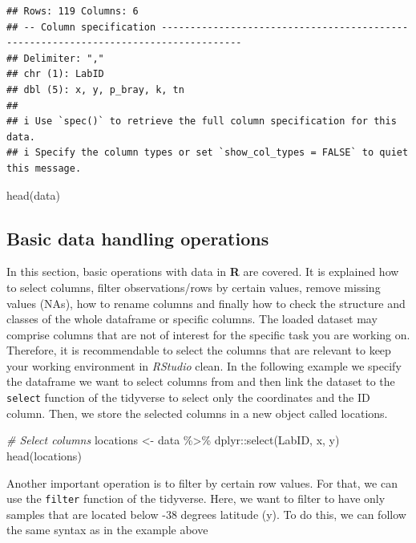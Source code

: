 \documentclass[
  10pt,
  b5paper,
  oneside]{book}
\newenvironment{Shaded}{\begin{snugshade}}{\end{snugshade}}
\newcommand{\CommentTok}[1]{\textcolor[rgb]{0.56,0.35,0.01}{\textit{#1}}}
\newcommand{\FunctionTok}[1]{\textcolor[rgb]{0.00,0.00,0.00}{#1}}
\newcommand{\NormalTok}[1]{#1}
\newcommand{\OtherTok}[1]{\textcolor[rgb]{0.56,0.35,0.01}{#1}}
\newcommand{\SpecialCharTok}[1]{\textcolor[rgb]{0.00,0.00,0.00}{#1}}
\begin{document}
\begin{verbatim}
## Rows: 119 Columns: 6
## -- Column specification ------------------------------------------------------------------------------------
## Delimiter: ","
## chr (1): LabID
## dbl (5): x, y, p_bray, k, tn
## 
## i Use `spec()` to retrieve the full column specification for this data.
## i Specify the column types or set `show_col_types = FALSE` to quiet this message.
\end{verbatim}

\begin{Shaded}
\begin{Highlighting}[]
\FunctionTok{head}\NormalTok{(data)}
\end{Highlighting}
\end{Shaded}

\hypertarget{basic-data-handling-operations}{%
\subsection{Basic data handling operations}\label{basic-data-handling-operations}}

In this section, basic operations with data in \textbf{R} are covered. It is explained how to select columns, filter observations/rows by certain values, remove missing values (NAs), how to rename columns and finally how to check the structure and classes of the whole dataframe or specific columns.
The loaded dataset may comprise columns that are not of interest for the specific task you are working on. Therefore, it is recommendable to select the columns that are relevant to keep your working environment in \emph{RStudio} clean. In the following example we specify the dataframe we want to select columns from and then link the dataset to the \texttt{select} function of the tidyverse to select only the coordinates and the ID column. Then, we store the selected columns in a new object called locations.

\begin{Shaded}
\begin{Highlighting}[]
\CommentTok{\# Select columns}
\NormalTok{locations }\OtherTok{\textless{}{-}}\NormalTok{ data }\SpecialCharTok{\%\textgreater{}\%}\NormalTok{ dplyr}\SpecialCharTok{::}\FunctionTok{select}\NormalTok{(LabID, x, y)}
\FunctionTok{head}\NormalTok{(locations)}
\end{Highlighting}
\end{Shaded}

Another important operation is to filter by certain row values. For that, we can use the \texttt{filter} function of the tidyverse. Here, we want to filter to have only samples that are located below -38 degrees latitude (y). To do this, we can follow the same syntax as in the example above
\end{document}
